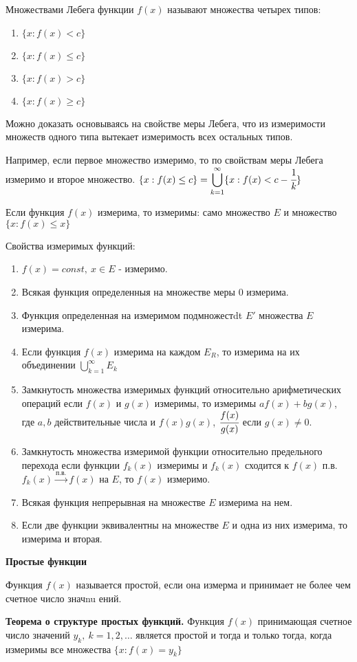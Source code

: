 \documentclass[12pt]{report}
\newcommand{\be}{\begin{enumerate}}
\newcommand{\ee}{\end{enumerate}}
\renewcommand{\[}{$\\\displaystyle}
\renewcommand{\]}{\\$}
\renewcommand{\[}{$\\\displaystyle}
\newcommand{\sep}{,\ }
\newcommand{\tth}[1][]{\textbf{Теорема#1.}}
\begin{document}
Множествами Лебега функции $f(x)$ называют множества четырех типов:

\be
  \item $\{x: f(x) < c\}$
  \item $\{x: f(x) \leq c\}$
  \item $\{x: f(x) > c\}$
  \item $\{x: f(x) \geq c\}$
\ee

Можно доказать основываясь на свойстве меры Лебега, что из измеримости множеств одного типа вытекает измеримость всех остальных типов.

Например, если первое множество измеримо, то по свойствам меры Лебега измеримо и второе множество.
\[\{x: f(x) \leq c\}= \bigcup_{k=1}^\infty\{x:f(x) < c - \cfrac{1}{k}\}\]

Если функция $f(x)$ измерима, то измеримы: само множество $E$ и множество $\{x:f(x)\leq x\}$

Свойства измеримых функций:

\be
  \item $f(x)=const \sep x \in E$ - измеримо.
  \item Всякая функция определенныя на множестве меры 0 измерима.
  \item Функция определенная на измеримом подмножестdt $E'$ множества $E$ измерима.
  \item Если функция $f(x)$ измерима на каждом $E_R$, то измерима на их объединении $\bigcup _ {k=1}^\infty E_k$
  \item Замкнутость множества измеримых функций относительно арифметических операций если $f(x)$ и $g(x)$ измеримы, то измеримы $af(x)+ bg(x)$, где $a,b$ действительные числа и $f(x)g(x)$, $\cfrac{f(x)}{g(x)}$ если $g(x) \neq 0$.
  \item Замкнутость множества измеримой функции относительно предельного перехода если функции $f_k(x)$ измеримы и $f_k(x)$ сходится к $f(x)$ п.в. $f_k(x) \xrightarrow{п.в.} f(x)$ на $E$, то $f(x)$ измеримо.
  \item Всякая функция непрерывная на множестве $E$ измерима на нем.
  \item Если две функции эквивалентны на множестве $E$ и одна из них измерима, то измерима и вторая.
\ee

\textbf{Простые функции}

Функция $f(x)$ называется простой, если она измерма и принимает не более чем счетное число значnu ений.

\tth[ о структуре простых функций] Функция $f(x)$ принимающая счетное число значений $y_k\sep k=1,2,\dots$ является простой и тогда и только тогда, когда измеримы все множества $\{x: f(x) = y_k \}$
\end{document}
